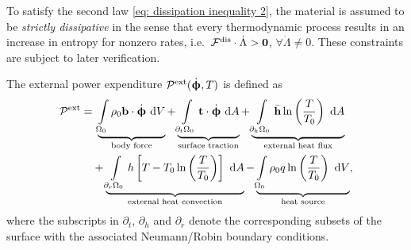 To satisfy the second law \eqref{eq: dissipation inequality 2}, the material is assumed to be \emph{strictly dissipative} in the sense that every thermodynamic process results in an increase in entropy for nonzero rates, i.e.\ $\mathcal{F}^\text{dis}\cdot\dot{\Lambda} > \boldsymbol{0}$, $\forall \dot{\Lambda} \neq 0$. These constraints are subject to later verification.

The external power expenditure $\mathcal{P}^\text{ext}(\dot{\boldsymbol{\upphi}}, T)$ is defined as
\begin{align}
  \mathcal{P}^\text{ext} = & \ \underbrace{\int\limits_{\Omega_0} \rho_0 \textbf{b} \cdot \dot{\boldsymbol{\upphi}} \text{ d}V}_\text{body force} + \underbrace{\int\limits_{\partial_t\Omega_0} \textbf{t} \cdot \dot{\boldsymbol{\upphi}} \text{ d}A}_\text{surface traction} + \underbrace{\int\limits_{\partial_h\Omega_0} \bar{\textbf{h}}\ln\left( \dfrac{T}{T_0} \right) \text{ d}A}_\text{external heat flux} \\
                           & + \underbrace{\int\limits_{\partial_r\Omega_0} h\left[ T - T_0 \ln\left( \dfrac{T}{T_0} \right) \right] \text{ d}A}_\text{external heat convection} - \underbrace{\int\limits_{\Omega_0} \rho_0 q \ln\left( \dfrac{T}{T_0} \right) \text{ d}V}_\text{heat source},
\end{align}
where the subscripts in $\partial_t$, $\partial_h$ and $\partial_r$ denote the corresponding subsets of the surface with the associated Neumann/Robin boundary conditions.

